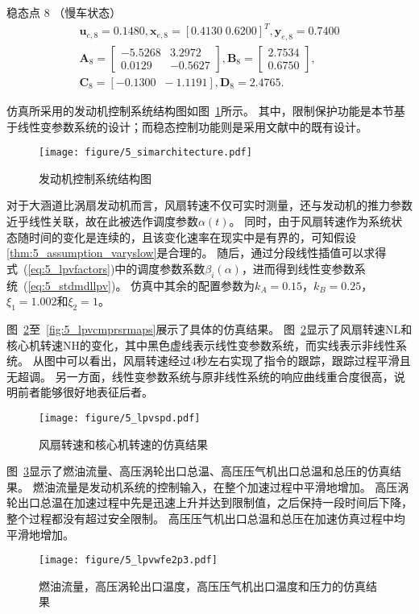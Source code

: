\documentclass{article}
\begin{document}
稳态点 8 （慢车状态）
\begin{equation}
\begin{matrix}
\bm{u}_{e,8}=0.1480,\bm{x}_{e,8}=[0.4130\;0.6200]^{T},\bm{y}_{e,8} = 0.7400\\
\mathbf{A}_8=
\begin{bmatrix}
-5.5268 & 3.2972\\
0.0129 & -0.5627
\end{bmatrix},
\mathbf{B}_8=
\begin{bmatrix}
 2.7534 \\
 0.6750
\end{bmatrix},\\
\mathbf{C}_8 = [-0.1300\;\;-1.1191],\mathbf{D}_8 = 2.4765.
\end{matrix}
\end{equation}

仿真所采用的发动机控制系统结构图如图~\ref{fig:5_simarchitecture}所示。
其中，限制保护功能是本节基于线性变参数系统的设计；而稳态控制功能则是采用文献\cite{Yang2017}中的既有设计。
\begin{figure}[!ht]
    \centering
    \texttt{[image: figure/5\_simarchitecture.pdf]}
    \caption{发动机控制系统结构图}
    \label{fig:5_simarchitecture}
\end{figure}

对于大涵道比涡扇发动机而言，风扇转速不仅可实时测量，还与发动机的推力参数近乎线性关联，故在此被选作调度参数$\alpha(t)$。
同时，由于风扇转速作为系统状态随时间的变化是连续的，且该变化速率在现实中是有界的，可知假设\ref{thm:5_assumption_varyslow}是合理的。
随后，通过分段线性插值可以求得式~(\ref{eq:5_lpvfactors})中的调度参数系数$\beta_i(\alpha)$，进而得到线性变参数系统~(\ref{eq:5_stdmdllpv})。
仿真中其余的配置参数为$k_A=0.15$，$k_B=0.25$，$\xi_1=1.002$和$\xi_2 = 1$。

图~\ref{fig:5_lpvspd}至~\ref{fig:5_lpvcmprsrmaps}展示了具体的仿真结果。
图~\ref{fig:5_lpvspd}显示了风扇转速NL和核心机转速NH的变化，其中黑色虚线表示线性变参数系统，而实线表示非线性系统。
从图中可以看出，风扇转速经过4秒左右实现了指令的跟踪，跟踪过程平滑且无超调。
另一方面，线性变参数系统与原非线性系统的响应曲线重合度很高，说明前者能够很好地表征后者。
\begin{figure}[!ht]
    \centering
    \texttt{[image: figure/5\_lpvspd.pdf]}
    \caption{风扇转速和核心机转速的仿真结果}
    \label{fig:5_lpvspd}
\end{figure}

图~\ref{fig:5_lpvwfe2p3}显示了燃油流量、高压涡轮出口总温、高压压气机出口总温和总压的仿真结果。
燃油流量是发动机系统的控制输入，在整个加速过程中平滑地增加。
高压涡轮出口总温在加速过程中先是迅速上升并达到限制值，之后保持一段时间后下降，整个过程都没有超过安全限制。
高压压气机出口总温和总压在加速仿真过程中均平滑地增加。
\begin{figure}[!ht]
    \centering
    \texttt{[image: figure/5\_lpvwfe2p3.pdf]}
    \caption{燃油流量，高压涡轮出口温度，高压压气机出口温度和压力的仿真结果}
    \label{fig:5_lpvwfe2p3}
\end{figure}
\end{document}

